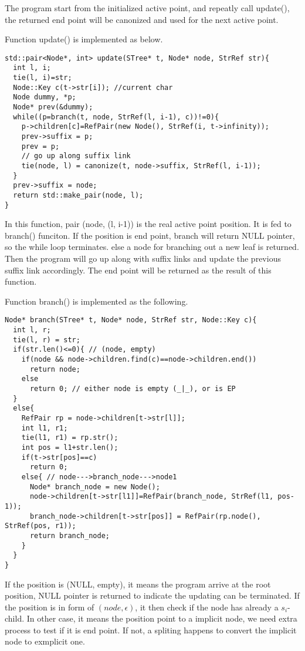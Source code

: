 \documentclass{article}
\begin{document}
The program start from the initialized active point, and repeatly
call update(), the returned end point will be canonized and used
for the next active point.

Function update() is implemented as below.

\begin{lstlisting}
std::pair<Node*, int> update(STree* t, Node* node, StrRef str){
  int l, i;
  tie(l, i)=str;
  Node::Key c(t->str[i]); //current char
  Node dummy, *p;
  Node* prev(&dummy);
  while((p=branch(t, node, StrRef(l, i-1), c))!=0){
    p->children[c]=RefPair(new Node(), StrRef(i, t->infinity));
    prev->suffix = p;
    prev = p;
    // go up along suffix link
    tie(node, l) = canonize(t, node->suffix, StrRef(l, i-1));
  }
  prev->suffix = node;
  return std::make_pair(node, l);
}
\end{lstlisting}

In this function, pair (node, (l, i-1)) is the real active point
position. It is fed to branch() funciton. If the position is
end point, branch will return NULL pointer, so the while loop
terminates. else a node for branching out a new leaf is returned.
Then the program will go up along with suffix links and update
the previous suffix link accordingly. The end point will be
returned as the result of this function.

Function branch() is implemented as the following.

\begin{lstlisting}
Node* branch(STree* t, Node* node, StrRef str, Node::Key c){
  int l, r;
  tie(l, r) = str;
  if(str.len()<=0){ // (node, empty)
    if(node && node->children.find(c)==node->children.end())
      return node;
    else
      return 0; // either node is empty (_|_), or is EP
  }
  else{
    RefPair rp = node->children[t->str[l]];
    int l1, r1;
    tie(l1, r1) = rp.str();
    int pos = l1+str.len();
    if(t->str[pos]==c)
      return 0;
    else{ // node--->branch_node--->node1
      Node* branch_node = new Node();
      node->children[t->str[l1]]=RefPair(branch_node, StrRef(l1, pos-1));
      branch_node->children[t->str[pos]] = RefPair(rp.node(), StrRef(pos, r1));
      return branch_node;
    }
  }
}
\end{lstlisting}

If the position is (NULL, empty), it means the program arrive at the
root position, NULL pointer is returned to indicate the updating can
be terminated. If the position is in form of $(node, \epsilon)$, it 
then check if the node has already a $s_i$-child. In other case, it
means the position point to a implicit node, we need extra process
to test if it is end point. If not, a spliting happens to convert the
implicit node to exmplicit one.
\end{document}
